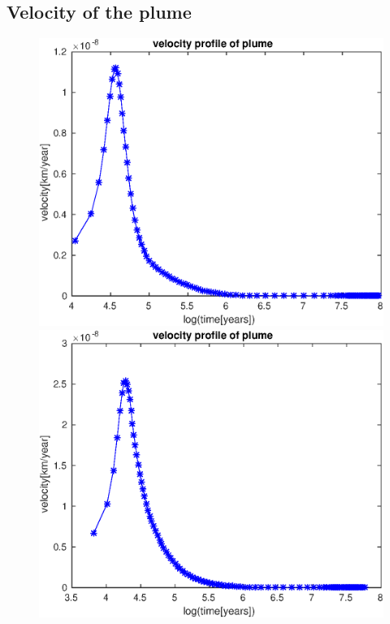 \documentclass[12pt]{scrartcl}
\begin{document}
\subsection{Velocity of the plume}
\begin{figure}
	\begin{minipage}[t]{1.0\textwidth}
		\begin{minipage}[t]{0.5\textwidth}
		\includegraphics[width=1.0\textwidth]{./Snapshots/ref/Subductionzonewithblobposrefslab20s2e7s2e7r20velocity.eps}
		\end{minipage}
		\begin{minipage}[t]{0.5\textwidth}
		\includegraphics[width=1.0\textwidth]{./Snapshots/ref/Subductionzonewithblobposrefslab30s2e7s2e7r20velocity.eps}

\end{minipage}
\end{minipage}
\end{figure}
\end{document}
